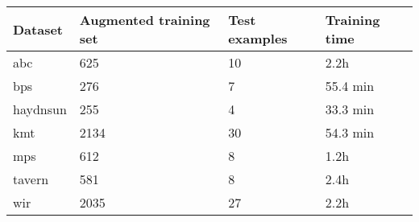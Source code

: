 \begin{tabular}{l|lll}
Dataset        & Augmented training set & Test examples & Training time \\ \hline
\gls{abc}      & 625                    & 10            & 2.2h          \\
\gls{bps}      & 276                    & 7             & 55.4 min      \\
\gls{haydnsun} & 255                    & 4             & 33.3 min      \\
\gls{kmt}      & 2134                   & 30            & 54.3 min      \\
\gls{mps}      & 612                    & 8             & 1.2h          \\
\gls{tavern}   & 581                    & 8             & 2.4h          \\
\gls{wir}      & 2035                   & 27            & 2.2h         
\end{tabular}

